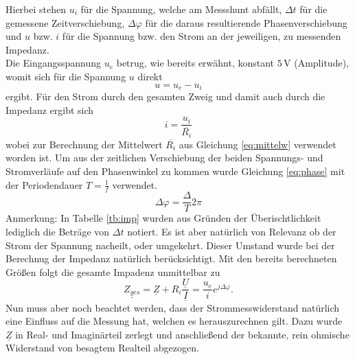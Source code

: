 Hierbei stehen $u_i$ für die Spannung, welche am Messshunt abfällt, $\Delta t$ für die gemessene Zeitverschiebung, $\Delta \varphi$ für die daraus resultierende Phasenverschiebung und $u$ bzw. $i$ für die Spannung bzw. den Strom an der jeweiligen, zu messenden Impedanz. \\
Die Eingangsspannung $u_e$ betrug, wie bereits erwähnt, konstant $5\,$V (Amplitude), womit sich für die Spannung $u$ direkt
\begin{equation}
	u = u_e - u_i
\end{equation}
ergibt. Für den Strom durch den gesamten Zweig und damit auch durch die Impedanz ergibt sich
\begin{equation}
	i = \frac{u_i}{\overline{R_i}}
\end{equation}
wobei zur Berechnung der Mittelwert $\overline{R_i}$ aus Gleichung \ref{eq:mittelw} verwendet worden ist. Um aus der zeitlichen Verschiebung der beiden Spannungs- und Stromverläufe auf den Phasenwinkel zu kommen wurde Gleichung \ref{eq:phase} mit der Periodendauer $T = \frac{1}{f}$ verwendet.
\begin{equation}
	\Delta \varphi = \frac{\Delta}{T}2 \pi
	\label{eq:phase}
\end{equation}
Anmerkung: In Tabelle \ref{tb:imp} wurden aus Gründen der Überischtlichkeit lediglich die Beträge von $\Delta t$ notiert. Es ist aber natürlich von Relevanz ob der Strom der Spannung nacheilt, oder umgekehrt. Dieser Umstand wurde bei der Berechnug der Impedanz natürlich berücksichtigt.
Mit den bereits berechneten Größen folgt die gesamte Impadenz unmittelbar zu 
\begin{equation}
	\underline{Z_{ges}} = \underline{Z} + R_i \frac{\underline{U}}{\underline{I}} = \frac{u_e}{i} e^{j\Delta \varphi} .
\end{equation}
Nun muss aber noch beachtet werden, dass der Strommesswiderstand natürlich eine Einfluss auf die Messung hat, welchen es herauszurechnen gilt. Dazu wurde $\underline{Z}$ in Real- und Imaginärteil zerlegt und anschließend der bekannte, rein ohmische Widerstand von besagtem Realteil abgezogen. 
